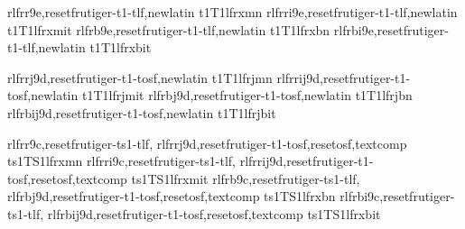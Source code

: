 

\installfonts



    {rlfrr9e,resetfrutiger-t1-tlf,newlatin}
    {t1}{T1}{lfrx}{m}{n}{}
    {rlfrri9e,resetfrutiger-t1-tlf,newlatin}
    {t1}{T1}{lfrx}{m}{it}{}
    {rlfrb9e,resetfrutiger-t1-tlf,newlatin}
    {t1}{T1}{lfrx}{b}{n}{}
    {rlfrbi9e,resetfrutiger-t1-tlf,newlatin}
    {t1}{T1}{lfrx}{b}{it}{}



    {rlfrrj9d,resetfrutiger-t1-tosf,newlatin}
    {t1}{T1}{lfrj}{m}{n}{}
    {rlfrrij9d,resetfrutiger-t1-tosf,newlatin}
    {t1}{T1}{lfrj}{m}{it}{}
    {rlfrbj9d,resetfrutiger-t1-tosf,newlatin}
    {t1}{T1}{lfrj}{b}{n}{}
    {rlfrbij9d,resetfrutiger-t1-tosf,newlatin}
    {t1}{T1}{lfrj}{b}{it}{}



    {rlfrr9c,resetfrutiger-ts1-tlf,%
     rlfrrj9d,resetfrutiger-t1-tosf,resetosf,textcomp}
    {ts1}{TS1}{lfrx}{m}{n}{}
    {rlfrri9c,resetfrutiger-ts1-tlf,%
     rlfrrij9d,resetfrutiger-t1-tosf,resetosf,textcomp}
    {ts1}{TS1}{lfrx}{m}{it}{}
    {rlfrb9c,resetfrutiger-ts1-tlf,%
     rlfrbj9d,resetfrutiger-t1-tosf,resetosf,textcomp}
    {ts1}{TS1}{lfrx}{b}{n}{}
    {rlfrbi9c,resetfrutiger-ts1-tlf,%
     rlfrbij9d,resetfrutiger-t1-tosf,resetosf,textcomp}
    {ts1}{TS1}{lfrx}{b}{it}{}
	



\endinstallfonts

\bye

